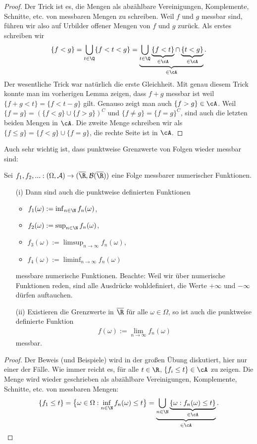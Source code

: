\begin{proof}
Der Trick ist es, die Mengen als abz\"ahlbare Vereinigungen, Komplemente, Schnitte, etc. von messbaren Mengen zu schreiben. Weil $f$ und $g$ messbar sind, f\"uhren wir also auf Urbilder offener Mengen von $f$ und $g$ zur\"uck. Als erstes schreiben wir 
 \begin{gather*}
		\{ f < g \} = \bigcup\limits_{t \in \Q} \{ f < t < g \} =\underbrace{\bigcup\limits_{t \in \Q} \underbrace{\{ f < t \}}_{\in \cA} \cap \underbrace{\{ t < g \}}_{\in \cA}}_{\in \cA}.
\end{gather*}	
Der wesentliche Trick war nat\"urlich die erste Gleichheit. Mit genau diesem Trick konnte man im vorherigen Lemma zeigen, dass $f+g$ messbar ist weil $\{f+g<t\}=\{f<t-g\}$ gilt. Genauso zeigt man auch $\{ f > g \} \in \cA$. Weil $\{ f = g \} = (\{ f < g \} \cup \{ f>g \})^C$ und $\{ f \neq g \} = \{ f = g \}^C$, sind auch die letzten beiden Mengen in $\cA$. Die zweite Menge schreiben wir als $\{f\leq g\}=\{f<g\}\cup \{f=g\}$, die rechte Seite ist in $\cA$.
\end{proof}
Auch sehr wichtig ist, dass punktweise Grenzwerte von Folgen wieder messbar sind:
\begin{prop}
	Sei $f_1, f_2, ...: (\Omega, \mathcal A)\to (\overline \R, \mathcal B(\overline\R))$ eine Folge messbarer numerischer Funktionen. 
	\begin{itemize}
	\item[(i)]
	Dann sind auch die punktweise definierten Funktionen 
	\begin{itemize}
		\item $f_1(\omega):=\inf_{n\in\N} f_n(\omega)$,
		\item $f_2(\omega):=\sup_{n\in\N} f_n(\omega)$,
		\item $f_3(\omega):=\limsup_{n\to \infty} f_n(\omega)$,
		\item $f_4(\omega):=\liminf_{n\to\infty} f_n(\omega)$
	\end{itemize}
	messbare numerische Funktionen. Beachte: Weil wir \"uber numerische Funktionen reden, sind alle Ausdr\"ucke wohldefiniert, die Werte $+\infty$ und $-\infty$ d\"urfen auftauchen.
	\item[(ii)] Existieren die Grenzwerte in $\overline \R$ f\"ur alle $\omega\in \Omega$, so ist auch die punktweise definierte Funktion
	\begin{align*}
		f(\omega):=\lim_{n\to\infty} f_n(\omega) 
	\end{align*}
	messbar.
\end{itemize}
\end{prop}
\begin{proof}
	Der Beweis (und Beispiele) wird in der gro\ss en \"Ubung diskutiert, hier nur einer der F\"alle. Wie immer reicht es, f\"ur alle $t\in\R$, $\{f_i\leq t\}\in \cA$ zu zeigen. Die Menge wird wieder geschrieben als abz\"ahlbare Vereinigungen, Komplemente, Schnitte, etc. von messbaren Mengen:
	\begin{align*}
		\{f_1\leq t\}=\big\{ \omega \in \Omega: \inf_{n\in\N} f_n(\omega)\leq t\big\}=\underbrace{\bigcup_{n\in\N}\underbrace{\{\omega: f_n(\omega)\leq t\}}_{\in \cA}}_{\in \cA}.
	\end{align*}
\end{proof}

